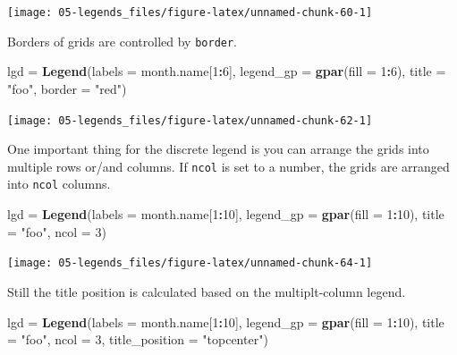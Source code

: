 \documentclass[]{book}
\newenvironment{Shaded}{\begin{snugshade}}{\end{snugshade}}
\newcommand{\KeywordTok}[1]{\textcolor[rgb]{0.13,0.29,0.53}{\textbf{#1}}}
\newcommand{\DataTypeTok}[1]{\textcolor[rgb]{0.13,0.29,0.53}{#1}}
\newcommand{\DecValTok}[1]{\textcolor[rgb]{0.00,0.00,0.81}{#1}}
\newcommand{\StringTok}[1]{\textcolor[rgb]{0.31,0.60,0.02}{#1}}
\newcommand{\OperatorTok}[1]{\textcolor[rgb]{0.81,0.36,0.00}{\textbf{#1}}}
\newcommand{\NormalTok}[1]{#1}
\theoremstyle{definition}
\theoremstyle{definition}
\theoremstyle{definition}
\theoremstyle{remark}
\begin{document}
\begin{center}\texttt{[image: 05-legends\_files/figure-latex/unnamed-chunk-60-1]} \end{center}

Borders of grids are controlled by \texttt{border}.

\begin{Shaded}
\begin{Highlighting}[]
\NormalTok{lgd =}\StringTok{ }\KeywordTok{Legend}\NormalTok{(}\DataTypeTok{labels =}\NormalTok{ month.name[}\DecValTok{1}\OperatorTok{:}\DecValTok{6}\NormalTok{], }\DataTypeTok{legend_gp =} \KeywordTok{gpar}\NormalTok{(}\DataTypeTok{fill =} \DecValTok{1}\OperatorTok{:}\DecValTok{6}\NormalTok{), }\DataTypeTok{title =} \StringTok{"foo"}\NormalTok{, }
    \DataTypeTok{border =} \StringTok{"red"}\NormalTok{)}
\end{Highlighting}
\end{Shaded}

\begin{center}\texttt{[image: 05-legends\_files/figure-latex/unnamed-chunk-62-1]} \end{center}

One important thing for the discrete legend is you can arrange the grids
into multiple rows or/and columns. If \texttt{ncol} is set to a number,
the grids are arranged into \texttt{ncol} columns.

\begin{Shaded}
\begin{Highlighting}[]
\NormalTok{lgd =}\StringTok{ }\KeywordTok{Legend}\NormalTok{(}\DataTypeTok{labels =}\NormalTok{ month.name[}\DecValTok{1}\OperatorTok{:}\DecValTok{10}\NormalTok{], }\DataTypeTok{legend_gp =} \KeywordTok{gpar}\NormalTok{(}\DataTypeTok{fill =} \DecValTok{1}\OperatorTok{:}\DecValTok{10}\NormalTok{), }
    \DataTypeTok{title =} \StringTok{"foo"}\NormalTok{, }\DataTypeTok{ncol =} \DecValTok{3}\NormalTok{)}
\end{Highlighting}
\end{Shaded}

\begin{center}\texttt{[image: 05-legends\_files/figure-latex/unnamed-chunk-64-1]} \end{center}

Still the title position is calculated based on the multiplt-column
legend.

\begin{Shaded}
\begin{Highlighting}[]
\NormalTok{lgd =}\StringTok{ }\KeywordTok{Legend}\NormalTok{(}\DataTypeTok{labels =}\NormalTok{ month.name[}\DecValTok{1}\OperatorTok{:}\DecValTok{10}\NormalTok{], }\DataTypeTok{legend_gp =} \KeywordTok{gpar}\NormalTok{(}\DataTypeTok{fill =} \DecValTok{1}\OperatorTok{:}\DecValTok{10}\NormalTok{), }\DataTypeTok{title =} \StringTok{"foo"}\NormalTok{, }
    \DataTypeTok{ncol =} \DecValTok{3}\NormalTok{, }\DataTypeTok{title_position =} \StringTok{"topcenter"}\NormalTok{)}
\end{Highlighting}
\end{Shaded}
\end{document}
